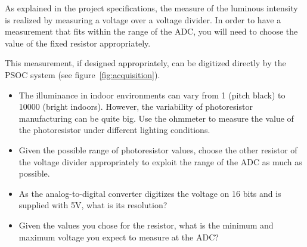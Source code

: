 \documentclass[11pt,a4paper]{article}
\theoremstyle{definition}%
\begin{document}
As explained in the project specifications, the measure of the luminous intensity is realized by measuring a voltage over a voltage divider. In order to have a measurement that fits within the range of the ADC, you will need to choose the value of the fixed resistor appropriately. 




This measurement, if designed appropriately, can be digitized directly by the PSOC system (see figure~\ref{fig:acquisition}).

\begin{itemize}
	\item The illuminance in indoor environments can vary from 1 (pitch black) to 10000 (bright indoors). However, the variability of photoresistor manufacturing can be quite big. Use the ohmmeter to measure the value of the photoresistor under different lighting conditions. 
	\item Given the possible range of photoresistor values, choose the other resistor of the voltage divider appropriately to exploit the range of the ADC as much as possible. 
	\item As the analog-to-digital converter digitizes the voltage on 16 bits and is supplied with 5V, what is its resolution?
	\item Given the values you chose for the resistor, what is the minimum and maximum voltage you expect to measure at the ADC? 
\end{itemize}
\end{document}
